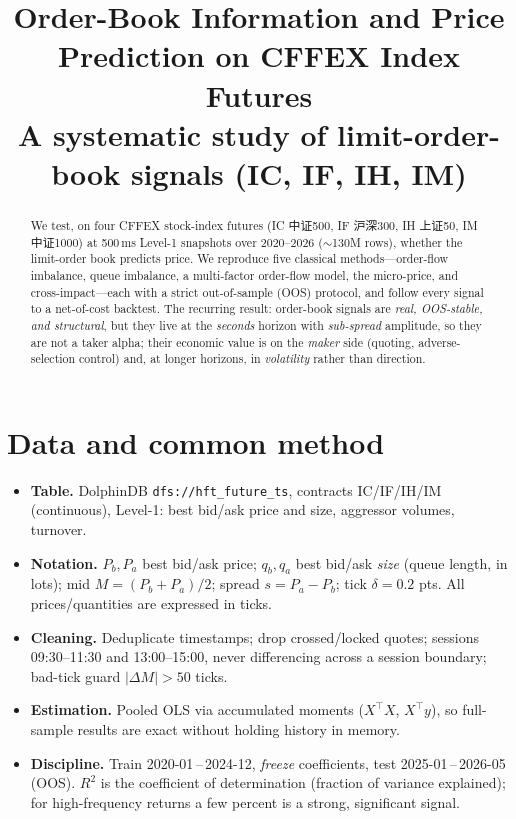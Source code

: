 \documentclass[11pt]{article}
\title{\textbf{Order-Book Information and Price Prediction on CFFEX Index Futures}\\
\large A systematic study of limit-order-book signals (IC, IF, IH, IM)}
\author{}
\date{}
\begin{document}
\maketitle

\begin{abstract}
We test, on four CFFEX stock-index futures (IC 中证500, IF 沪深300, IH 上证50,
IM 中证1000) at 500\,ms Level-1 snapshots over 2020--2026 ($\sim$130M rows), whether the
limit-order book predicts price. We reproduce five classical methods---order-flow imbalance,
queue imbalance, a multi-factor order-flow model, the micro-price, and cross-impact---each with
a strict out-of-sample (OOS) protocol, and follow every signal to a net-of-cost backtest.
The recurring result: order-book signals are \emph{real, OOS-stable, and structural}, but they
live at the \emph{seconds} horizon with \emph{sub-spread} amplitude, so they are not a
taker alpha; their economic value is on the \emph{maker} side (quoting, adverse-selection control)
and, at longer horizons, in \emph{volatility} rather than direction.
\end{abstract}

\section{Data and common method}
\begin{itemize}[leftmargin=*]
  \item \textbf{Table.} DolphinDB \texttt{dfs://hft\_future\_ts}, contracts IC/IF/IH/IM
        (continuous), Level-1: best bid/ask price and size, aggressor volumes, turnover.
  \item \textbf{Notation.} $P_b,P_a$ best bid/ask price; $q_b,q_a$ best bid/ask \emph{size}
        (queue length, in lots); mid $M=(P_b+P_a)/2$; spread $s=P_a-P_b$; tick $\delta=0.2$ pts.
        All prices/quantities are expressed in ticks.
  \item \textbf{Cleaning.} Deduplicate timestamps; drop crossed/locked quotes; sessions
        09:30--11:30 and 13:00--15:00, never differencing across a session boundary; bad-tick
        guard $|\Delta M|>50$ ticks.
  \item \textbf{Estimation.} Pooled OLS via accumulated moments ($X^\top X$, $X^\top y$), so
        full-sample results are exact without holding history in memory.
  \item \textbf{Discipline.} Train 2020-01\,--\,2024-12, \emph{freeze} coefficients, test
        2025-01\,--\,2026-05 (OOS). $R^2$ is the coefficient of determination (fraction of
        variance explained); for high-frequency returns a few percent is a strong, significant signal.
\end{itemize}
\end{document}
